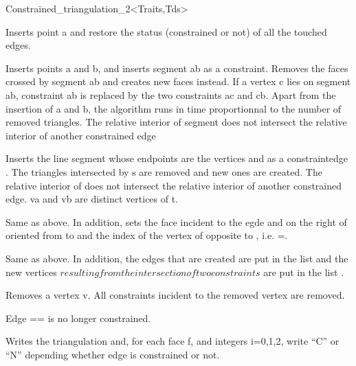\begin{ccClassTemplate} {Constrained_triangulation_2<Traits,Tds>}

{ Inserts point a and restore the status (constrained or not) of all
the
touched edges.}

{ Inserts points a and b, and inserts segment ab as a
constraint. Removes the faces crossed by segment ab and creates new
faces instead. If a vertex c lies on segment ab, constraint ab is
replaced by the two constraints ac and cb. Apart from the insertion of
a and b, the algorithm runs in time proportionnal to the number of
removed triangles. 
\ccPrecond The relative interior of segment  does not
intersect the relative interior of another constrained edge}

{ Inserts the line segment  whose endpoints are the vertices 
 and
  as a constraintedge . The triangles intersected by s
are removed and new ones are created. 
\ccPrecond The relative interior of  does not
intersect the relative interior of another constrained edge.  
\ccPrecond  va and vb are distinct vertices of t.  }

{Same as above. In addition,  sets the face  incident to the
egde  
and on the right of  oriented from   to 
and the index   of the vertex of  opposite to
, i.e.  =.}	    

{Same as above. In addition,  the edges that are created are put in
the list  and the new vertices
\(resulting from the intersection of two constraints\) are put in the
list
.}

{ Removes a vertex v. All constraints incident to the removed vertex are removed. }

{ Edge == is no longer constrained.}


{Writes the triangulation and, for each face f, and integers i=0,1,2,
write ``C'' or ``N'' depending whether edge 
 is constrained or not.}



\end{ccClassTemplate}
